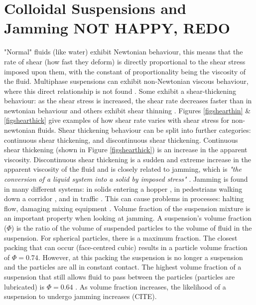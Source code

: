 \documentclass[a4]{report}
\begin{document}
	\section{Colloidal Suspensions and Jamming NOT HAPPY, REDO}
	"Normal" fluids (like water) exhibit Newtonian behaviour, this means that the rate of shear (how fast they deform) is directly proportional to the shear stress imposed upon them, with the constant of proportionality being the viscosity of the fluid\cite[p.~252]{schadict}. Multiphase suspensions can exhibit non-Newtonian viscous behaviour, where this direct relationship is not found \cite[p.~255-256]{schadict}. Some exhibit a shear-thickening behaviour: as the shear stress is increased, the shear rate decreases faster than in newtonian behaviour and others exhibit shear thinning \cite{backtypesofnonnewt}. Figures \ref{figshearthin} \& \ref{figshearthick} give examples of how shear rate varies with shear stress for non-newtonian fluids. Shear thickening behaviour can be split into further categories: continuous shear thickening, and discontinuous shear thickening. Continuous shear thickening (shown in Figure \ref{figshearthick})  is an increase in the apparent viscosity. Discontinuous shear thickening is a sudden and extreme increase in the apparent viscosity of the fluid and is closely related to jamming, which is \textit{"the conversion of a liquid system into a solid by imposed stress"} \cite{backhawjam}. Jamming is found in many different systems: in solids entering a hopper \cite{back2djam}, in pedestrians walking down a corridor \cite{backpedjam}, and in traffic \cite{backcarjam}. This can cause problems in processes: halting flow, damaging mixing equipment \cite{backshearjambertrand}. \newline \newline \noindent
	Volume fraction of the suspension mixture is an important property when looking at jamming. A suspension's volume fraction (\( \Phi \)) is the ratio of the volume of suspended particles to the volume of fluid in the suspension. For spherical particles, there is a maximum fraction. The closest packing that can occur (face-centred cubic) results in a particle volume fraction of \( \Phi = 0.74 \). However, at this packing the suspension is no longer a suspension and the particles are all in constant contact. The highest volume fraction of a suspension that still allows fluid to pass between the particles (particles are lubricated) is \( \Phi = 0.64 \) \cite{backguypoonjam}. As volume fraction increases, the likelihood of a suspension to undergo jamming increases (CITE).
\end{document}
